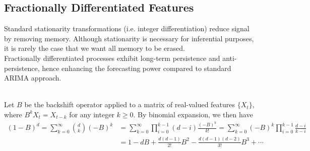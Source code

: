 \subsection{Fractionally Differentiated Features}

Standard stationarity transformations (i.e. integer differentiation) reduce signal by removing memory. Although stationarity is necessary for inferential purposes, it is rarely the case that we want all memory to be erased.\\
Fractionally differentiated processes exhibit long-term persistence and anti-persistence, hence enhancing the forecasting power compared to standard ARIMA approach.

\begin{definition} \\
Let $B$ be the backshift operator applied to a matrix of real-valued features $\{X_t \}$, where $B^k X_t = X_{t-k}$ for any integer $k \geq 0$. By binomial expansion, we then have
\begin{align*}
(1-B)^d = \sum\limits_{k=0}^{\infty} \binom{d}{k} (-B)^k &= \sum\limits_{k=0}^{\infty} \prod\limits_{i=0}^{k-1} (d-i) \frac{(-B)^k}{k!} = \sum\limits_{k=0}^{\infty} (-B)^k \prod\limits_{i=0}^{k-1} \frac{d-i}{k-i} \nonumber \\
&= 1 - dB + \frac{d(d-1)}{2!} B^2 - \frac{d(d-1)(d-2)}{3!} B^3 + \cdots \nonumber 
\end{align*}
\end{definition}

